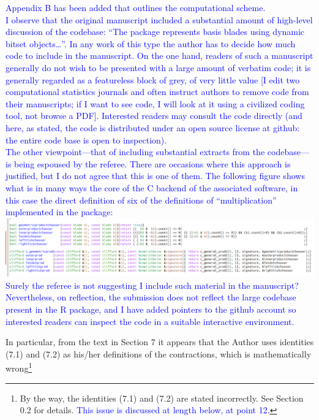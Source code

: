 \documentclass{article}
\begin{document}
\begin{itemize}
    \textcolor{blue}{Appendix B has been added that outlines the
      computational scheme.\\I observe that the original manuscript included a
      substantial amount of high-level discussion of the codebase:
      ``The package represents basis blades using dynamic bitset
      objects\ldots''.  In any work of this type the author has to
      decide how much code to include in the manuscript.  On the one
      hand, readers of such a manuscript generally do not wish to be
      presented with a large amount of verbatim code; it is generally
      regarded as a featureless block of grey, of very little value [I
        edit two computational statistics journals and often instruct
        authors to remove code from their manuscripts; if I want to
        see code, I will look at it using a civilized coding tool, not
        browse a PDF].  Interested readers may consult the code
      directly (and here, as stated, the code is distributed under an
      open source license at github: the entire code base is open to
      inspection).\\[10pt] The other viewpoint---that of including
      substantial extracts from the codebase---is being espoused by
      the referee.  There are occasions where this approach is
      justified, but I do not agree that this is one of them.  The
      following figure shows what is in many ways the core of the C
      backend of the associated software, in this case the direct
      definition of six of the definitions of ``multiplication''
      implemented in the package:\\[10pt]
      \includegraphics[width=6in]{code.png}\\[10pt] Surely the referee
      is not suggesting I include such material in the manuscript?
      Nevertheless, on reflection, the submission does not reflect the
      large codebase present in the R package, and I have added
      pointers to the github account so interested readers can inspect
      the code in a suitable interactive environment.}

    In particular, from the text in Section 7 it appears that the
    Author uses identities (7.1) and (7.2) as his/her definitions of
    the contractions, which is mathematically wrong\footnote{By the
    way, the identities (7.1) and (7.2) are stated incorrectly.  See
    Section 0.2 for details. \textcolor{blue}{This issue is discussed
      at length below, at point 12.}}


\end{itemize}
\end{document}
